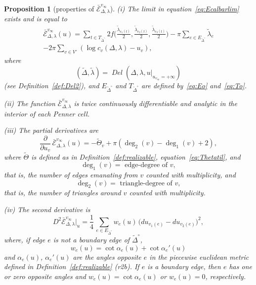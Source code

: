 \documentclass[a4paper, 11pt]{article}
\newcommand{\Deltil}{\widetilde{\Delta}}
\newcommand{\Deltilo}{\Deltil^{\circ}}
\newcommand{\lamtil}{\tilde{\lambda}}
\newcommand{\Thetatil}{\widetilde{\Theta}}
\newcommand{\Del}{\operatorname{\textit{Del}}}
\newcommand{\Ecal}{\mathcal{E}}
\newcommand{\Ecalbar}{\bar{\Ecal}}
\newcommand{\Vo}{V^{\circ}}
\theoremstyle{plain}
\newtheorem{proposition}[theorem]{Proposition}
\theoremstyle{definition}
\begin{document}
\begin{proposition}[properties of $\Ecalbar^{v_{\infty}}_{\Delta,\lambda}$]
  \label{prop:Ecalbar}
  (i) The limit in equation~\eqref{eq:Ecalbarlim} exists and is equal to
  \begin{multline}
    \label{eq:Ecalbar}
    \Ecalbar^{v_{\infty}}_{\Delta,\lambda}(u) = \sum_{t\in
      T_{\Deltilo}} 2f \Big( \frac{\lamtil_{e_{1}(t)}}{2},
    \frac{\lamtil_{e_{2}(t)}}{2}, \frac{\lamtil_{e_{3}(t)}}{2} \Big)
    -\pi\sum_{e\in E_{\Deltilo}}\lamtil_{e}
    \\
    -2\pi\sum_{v\in \Vo}(\log c_{v}(\Delta,\lambda)-u_{v}),
  \end{multline}
  where 
  \begin{equation}
    \label{eq:Deltillamtil}
    (\Deltil,\lamtil)
    =\Del(\Delta,\lambda,u|_{u_{v_{\infty}}=+\infty})
  \end{equation}
  (see Definition~\ref{def:Del2}), and $E_{\Deltilo}$ and $T_{\Deltilo}$
  are defined by~\eqref{eq:Eo} and~\eqref{eq:To}.
  
  (ii) The function $\Ecalbar^{v_{\infty}}_{\Delta,\lambda}$ is twice
  continuously differentiable and analytic in the interior of each
  Penner cell.

  (iii) The partial derivatives are
  \begin{equation}
    \label{eq:dEcalbar}
    \frac{\partial}{\partial u_{v}}\,
    \Ecalbar^{v_{\infty}}_{\Delta,\lambda}(u)
    =
    -\Thetatil_{v}+\pi(\deg_{2}(v)-\deg_{1}(v)+2),
  \end{equation}
  where $\Thetatil$ is defined as in Definition~\ref{def:realizable},
  equation~\eqref{eq:Thetatil}, and
  \begin{equation*}
    \deg_{1}(v)=\text{ edge-degree of $v$},
  \end{equation*}
  that is, the number of edges emanating from $v$ counted with
  multiplicity, and
  \begin{equation*}
    \deg_{2}(v)=\text{ triangle-degree of $v$},
  \end{equation*}
  that is, the number of triangles around $v$ counted with
  multiplicity.

  (iv) The second derivative is 
  \begin{equation}
   \label{eq:d2Ecalbar}
    D^{2}\Ecalbar^{v_{\infty}}_{\Delta,\lambda}\big|_{u}
    = 
    \frac{1}{4}\,\sum_{e\in E_{\Deltilo}}
    w_{e}(u)\,\big(du_{v_{1}(e)}-du_{v_{2}(e)}\big)^{2},
  \end{equation}
  where, if edge $e$ is not a boundary edge of $\Deltilo$,
  \begin{equation*}
    w_{e}(u)=\cot\alpha_{e}(u)+\cot\alpha_{e}'(u)
  \end{equation*}
  and $\alpha_{e}(u)$, $\alpha_{e}'(u)$ are the angles opposite $e$ in
  the piecewise euclidean metric defined in
  Definition~\ref{def:realizable} (r2b). If $e$ is a boundary edge,
  then $e$ has one or zero opposite angles and
  $w_{e}(u)=\cot\alpha_{e}(u)$ or $w_{e}(u)=0$, respectively.


\end{proposition}
\end{document}
